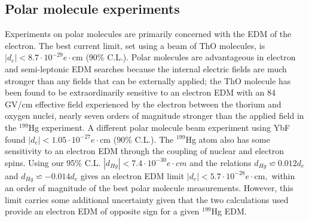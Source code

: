 \documentclass [10pt, twoside] {uwthesis}[2012/04/02]
\begin{document}
\subsection{Polar molecule experiments} %
Experiments on polar molecules are primarily concerned with the EDM of the electron. The best current limit, set using a beam of ThO molecules, is $|d_{e}| < 8.7\cdot 10^{-29} e\cdot \text{cm}$ (90\% C.L.)\cite{2014_ACME_eEDM}. Polar molecules are advantageous in electron and semi-leptonic EDM searches because the internal electric fields are much stronger than any fields that can be externally applied; the ThO molecule has been found to be extraordinarily sensitive to an electron EDM with an 84 GV/cm effective field experienced by the electron between the thorium and oxygen nuclei, nearly seven orders of magnitude stronger than the applied field in the $^{199}$Hg experiment. A different polar molecule beam experiment using YbF found $|d_{e}| < 1.05\cdot 10^{-27} e \cdot \text{cm}$ (90\% C.L.)\cite{2011_YbF_EDM}. The $^{199}$Hg atom also has some sensitivity to an electron EDM through the coupling of nuclear and electron spins. Using our 95\% C.L. $|d_{Hg}| < 7.4\cdot 10^{-30} e\cdot cm$ and the relations $d_{Hg}\backsimeq 0.012 d_{e}$ \cite{1987_Martensson_Oster_eEDM} and $d_{Hg}\backsimeq -0.014 d_{e}$ \cite{1985_Flambaum_Khriplovich_eEDM_bound} gives an electron EDM limit $|d_{e}| < 5.7\cdot 10^{-28} e\cdot \text{cm},$ within an order of magnitude of the best polar molecule measurements. However, this limit carries some additional uncertainty given that the two calculations used provide an electron EDM of opposite sign for a given $^{199}$Hg EDM. 
\end{document}
